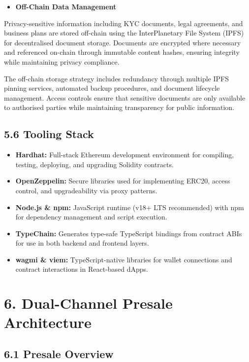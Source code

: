 \documentclass[
  paper=a4,
  ,captions=tableheading
]{scrartcl}
\providecommand{\tightlist}{%
  \setlength{\itemsep}{0pt}\setlength{\parskip}{0pt}}
\begin{document}
\begin{itemize}
\tightlist
\item
  \textbf{Off-Chain Data Management}
\end{itemize}

Privacy-sensitive information including KYC documents, legal agreements,
and business plans are stored off-chain using the InterPlanetary File
System (IPFS) for decentralised document storage. Documents are
encrypted where necessary and referenced on-chain through immutable
content hashes, ensuring integrity while maintaining privacy compliance.

The off-chain storage strategy includes redundancy through multiple IPFS
pinning services, automated backup procedures, and document lifecycle
management. Access controls ensure that sensitive documents are only
available to authorised parties while maintaining transparency for
public information.

\subsection{5.6 Tooling Stack}\label{tooling-stack}

\begin{itemize}
\tightlist
\item
  \textbf{Hardhat:} Full-stack Ethereum development environment for
  compiling, testing, deploying, and upgrading Solidity contracts.
\item
  \textbf{OpenZeppelin:} Secure libraries used for implementing ERC20,
  access control, and upgradeability via proxy patterns.
\item
  \textbf{Node.js \& npm:} JavaScript runtime (v18+ LTS recommended)
  with npm for dependency management and script execution.
\item
  \textbf{TypeChain:} Generates type-safe TypeScript bindings from
  contract ABIs for use in both backend and frontend layers.
\item
  \textbf{wagmi \& viem:} TypeScript-native libraries for wallet
  connections and contract interactions in React-based dApps.
\end{itemize}

\section{6. Dual-Channel Presale Architecture}\label{dual-channel-presale-architecture}

\subsection{6.1 Presale Overview}\label{presale-overview}
\end{document}
